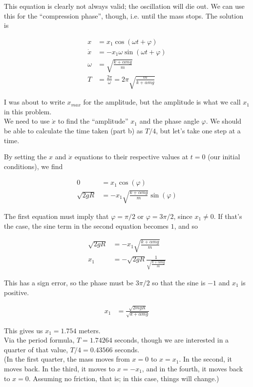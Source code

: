 \documentclass[8.01x]{subfiles}
\begin{document}
This equation is clearly not always valid; the oscillation will die out. We can use this for the ``compression phase'', though, i.e. until the mass stops. The solution is

\begin{align}
x &= x_1 \cos (\omega t + \varphi)\\
\dot{x} &= -x_1 \omega \sin(\omega t + \varphi)\\
\omega &= \sqrt{\frac{k + \alpha m g}{m}}\\
T &= \frac{2 \pi}{\omega} = 2\pi \sqrt{\frac{m}{k + \alpha m g}}
\end{align}

I was about to write $x_{max}$ for the amplitude, but the amplitude is what we call $x_1$ in this problem.\\
We need to use $\dot{x}$ to find the ``amplitude'' $x_1$ and the phase angle $\varphi$. We should be able to calculate the time taken (part b) as $T/4$, but let's take one step at a time.

By setting the $x$ and $\dot{x}$ equations to their respective values at $t = 0$ (our initial conditions), we find

\begin{align}
0 &= x_1 \cos (\varphi)\\
\sqrt{2 g R} &= - x_1 \sqrt{\frac{k + \alpha m g}{m}} \sin (\varphi)
\end{align}

The first equation must imply that $\varphi = \pi/2$ or $\varphi = 3\pi/2$, since $x_1 \neq 0$. If that's the case, the sine term in the second equation becomes $1$, and so

\begin{align}
\sqrt{2 g R} &= - x_1 \sqrt{\frac{k + \alpha m g}{m}}\\
x_1 &= -\sqrt{2 g R} \frac{1}{\sqrt{\frac{k + \alpha m g}{m}}}
\end{align}

This has a sign error, so the phase must be $3 \pi/2$ so that the sine is $-1$ and $x_1$ is positive.

\begin{align}
x_1 &= \frac{\sqrt{2 m g R}}{\sqrt{k + \alpha m g}}
\end{align}

This gives us $x_1 = 1.754$ meters.\\
Via the period formula, $T = 1.74264$ seconds, though we are interested in a quarter of that value, $T/4 = 0.43566$ seconds.\\
(In the first quarter, the mass moves from $x=0$ to $x = x_1$. In the second, it moves back. In the third, it moves to $x = -x_1$, and in the fourth, it moves back to $x = 0$. Assuming no friction, that is; in this case, things will change.)
\end{document}
